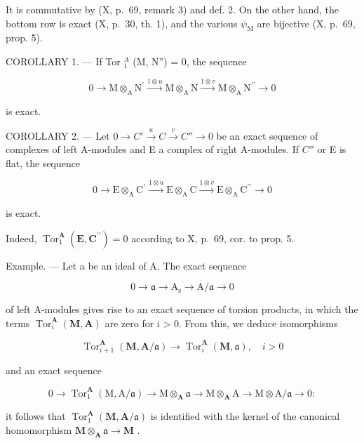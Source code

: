 It is commutative by (X, p.~69, remark 3) and def. 2. On the other hand, the bottom row is exact (X, p.~30, th. 1), and the various \(\psi_{\mathrm{M}}\) are bijective (X, p.~69, prop. 5).

COROLLARY 1. --- If Tor \(_{1}^{A}\) (M, N'') = 0, the sequence

\[
0 \longrightarrow \mathrm{M} \otimes_ {\mathrm{A}} \mathrm{N} ^ {\prime} \xrightarrow {1 \otimes u} \mathrm{M} \otimes_ {\mathrm{A}} \mathrm{N} \xrightarrow {1 \otimes v} \mathrm{M} \otimes_ {\mathrm{A}} \mathrm{N} ^ {\prime \prime} \longrightarrow 0
\]

is exact.

COROLLARY 2. --- Let \(0 \to C' \xrightarrow{u} C \xrightarrow{v} C'' \to 0\) be an exact sequence of complexes of left A-modules and E a complex of right A-modules. If \(C''\) or E is flat, the sequence

\[
0 \longrightarrow \mathrm{E} \otimes_ {\mathrm{A}} \mathrm{C} ^ {\prime} \xrightarrow {1 \otimes u} \mathrm{E} \otimes_ {\mathrm{A}} \mathrm{C} \xrightarrow {1 \otimes v} \mathrm{E} \otimes_ {\mathrm{A}} \mathrm{C} ^ {\prime \prime} \longrightarrow 0
\]

is exact.

Indeed, \(\operatorname{Tor}_1^{\mathbf{A}}(\mathbf{E},\mathbf{C}^{\prime \prime}) = 0\) according to X, p.~69, cor. to prop. 5.

Example. --- Let a be an ideal of A. The exact sequence

\[
0 \rightarrow \mathfrak {a} \rightarrow \mathrm{A} _ {\mathrm{s}} \rightarrow \mathrm{A} / \mathfrak {a} \rightarrow 0
\]

of left A-modules gives rise to an exact sequence of torsion products, in which the terms \(\operatorname{Tor}_{i}^{\mathbf{A}}(\mathbf{M},\mathbf{A})\) are zero for i \textgreater{} 0. From this, we deduce isomorphisms

\[
\operatorname{Tor} _ {i + 1} ^ {\mathbf {A}} (\mathbf {M}, \mathbf {A} / \mathfrak {a}) \rightarrow \operatorname{Tor} _ {i} ^ {\mathbf {A}} (\mathbf {M}, \mathfrak {a}), \quad i > 0
\]

and an exact sequence

\[
0 \rightarrow \operatorname{Tor} _ {1} ^ {\mathbf {A}} (\mathrm{M}, \mathrm{A} / \mathfrak {a}) \rightarrow \mathrm{M} \otimes_ {\mathbf {A}} \mathfrak {a} \rightarrow \mathrm{M} \otimes_ {\mathbf {A}} \mathrm{A} \rightarrow \mathrm{M} \otimes \mathrm{A} / \mathfrak {a} \rightarrow 0:
\]

it follows that \(\operatorname{Tor}_{1}^{\mathbf{A}}(\mathbf{M},\mathbf{A}/\mathfrak{a})\) is identified with the kernel of the canonical homomorphism \(\mathbf{M}\otimes_{\mathbf{A}}\mathfrak{a}\to\mathbf{M}\) .

